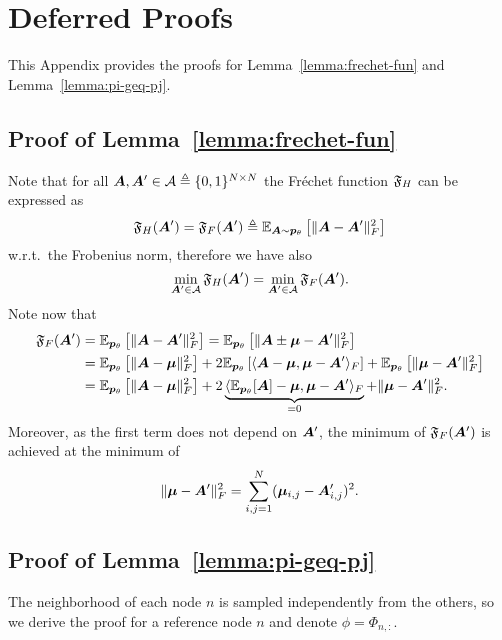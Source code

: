 \section{Deferred Proofs}\label{a:proofs}

This Appendix provides the proofs for Lemma~\ref{lemma:frechet-fun} and Lemma~\ref{lemma:pi-geq-pj}.

\subsection{Proof of Lemma~\ref{lemma:frechet-fun}}\label{a:proof-lemma:frechet-fun}
Note that for all ${\bm{A}},{\bm{A}}'\in {\mathcal{A}} \triangleq \{0,1\}^{N\times N}$  the Fr\'echet function $\mathfrak{F}_H$ can be expressed as
\begin{equation}
\mathfrak{F}_H({\bm{A}}') = \mathfrak{F}_F({\bm{A}}') \triangleq \mathbb{E}_{{\bm{A}}\sim{{\bm{p}}_\theta}}\left[\lVert {\bm{A}} - {\bm{A}}'\rVert_F^2\right]
\end{equation}
w.r.t.\ the Frobenius norm, therefore we have also 
\begin{equation}
\min_{{\bm{A}}'\in {\mathcal{A}}} \mathfrak{F}_H({\bm{A}}') = 
\min_{{\bm{A}}'\in {\mathcal{A}}} \mathfrak{F}_F({\bm{A}}').
\end{equation}
Note now that 
\begin{align}
\mathfrak{F}_F({\bm{A}}') &=  \mathbb{E}_{{\bm{p}}_\theta}\left[\lVert {\bm{A}} - {\bm{A}}'\rVert^2_F\right] 
    =   \mathbb{E}_{{\bm{p}}_\theta}\left[\lVert {\bm{A}} \pm \boldsymbol{\mu} - {\bm{A}}'\rVert^2_F\right]
\\& =   \mathbb{E}_{{\bm{p}}_\theta}\left[\lVert {\bm{A}} - \boldsymbol{\mu}\rVert^2_F\right] 
        + 2 \mathbb{E}_{{\bm{p}}_\theta}\left[\langle {\bm{A}}-\boldsymbol{\mu} ,\boldsymbol{\mu} - {\bm{A}}'\rangle_F\right] 
        +   \mathbb{E}_{{\bm{p}}_\theta}\left[\lVert \boldsymbol{\mu} - {\bm{A}}'\rVert^2_F\right]
\\& =   \mathbb{E}_{{\bm{p}}_\theta}\left[\lVert {\bm{A}} - \boldsymbol{\mu}\rVert^2_F\right] 
        + 2 \underbrace{\langle \mathbb{E}_{{\bm{p}}_\theta}[{\bm{A}}]-\boldsymbol{\mu} ,\boldsymbol{\mu} - {\bm{A}}'\rangle_F}_{=0} 
        +   \lVert \boldsymbol{\mu} - {\bm{A}}'\rVert^2_F.
\end{align}
Moreover, as the first term does not depend on ${\bm{A}}'$, the minimum of $\mathfrak{F}_F({\bm{A}}')$ is achieved at the minimum of 
\begin{equation}
\lVert \boldsymbol{\mu} - {\bm{A}}'\rVert^2_F=\sum_{i,j=1}^N(\boldsymbol{\mu}_{i,j} - {\bm{A}}_{i,j}')^2.
\end{equation}




\subsection{Proof of Lemma~\ref{lemma:pi-geq-pj}}
The neighborhood of each node $n$ is sampled independently from the others, so we derive the proof for a reference node $n$ and denote $\phi=\Phi_{n,:}$.

